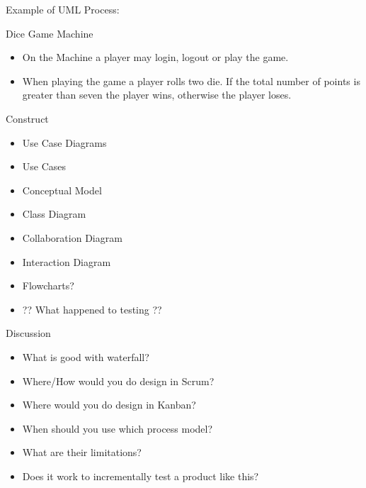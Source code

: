\documentclass[10pt,t,a4paper]{beamer}
\begin{document}
\begin{frame}[shrink=15,label=sec-1-4]{Example of UML Process:}

\begin{block}{Dice Game Machine}
\begin{itemize}
\item On the Machine a player may login, logout or play the game.
\item When playing the game a player rolls two die. If the total number of points is greater than seven the player wins, otherwise the player loses.
\end{itemize}
\end{block}

\begin{block}{Construct}
\begin{itemize}
\item Use Case Diagrams
\item Use Cases
\item Conceptual Model
\item Class Diagram
\item Collaboration Diagram
\item Interaction Diagram
\item Flowcharts?
\item ?? What happened to testing ??
\end{itemize}
\end{block}
\end{frame}
\begin{frame}[label=sec-1-5]{Discussion}
\begin{itemize}
\item What is good with waterfall?
\item Where/How would you do design in Scrum?
\item Where would you do design in Kanban?
\item When should you use which process model?
\item What are their limitations?
\item Does it work to incrementally test a product like this?
\end{itemize}
\end{frame}
\end{document}
